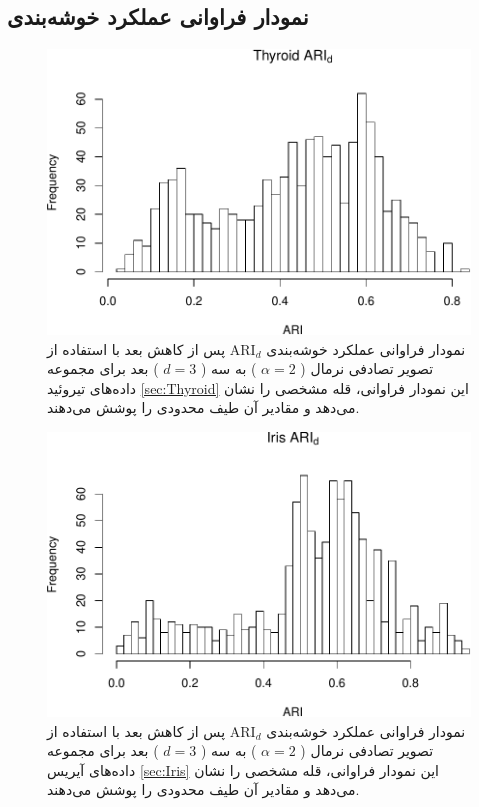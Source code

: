 \subsection{نمودار فراوانی عملکرد خوشه‌بندی}


\begin{figure}[H]
\centering
\includegraphics[width=0.7\linewidth]{Report_files/figure-latex/unnamed-chunk-6-1}
\caption{
نمودار فراوانی عملکرد خوشه‌بندی 
$\mathrm{ARI}_d$
پس از کاهش بعد با استفاده از تصویر تصادفی
نرمال (%
$\alpha=2$%
)
به 
سه (%
$d=3$%
)
بعد برای مجموعه داده‌های
تیروئید
\ref{sec:Thyroid}
این نمودار فراوانی،
قله
مشخصی را نشان 
می‌دهد
و مقادیر آن طیف 
محدودی
را پوشش می‌دهند.
}
\end{figure}


\begin{figure}[H]
\centering
\includegraphics[width=0.7\linewidth]{Report_files/figure-latex/unnamed-chunk-6-2}
\caption{
نمودار فراوانی عملکرد خوشه‌بندی 
$\mathrm{ARI}_d$
پس از کاهش بعد با استفاده از تصویر تصادفی
نرمال (%
$\alpha=2$%
)
به
سه (%
$d=3$%
)
بعد برای مجموعه داده‌های
آیریس
\ref{sec:Iris}
این نمودار فراوانی،
قله
مشخصی را نشان 
می‌دهد
و مقادیر آن طیف 
محدودی
را پوشش می‌دهند.
}
\end{figure}


